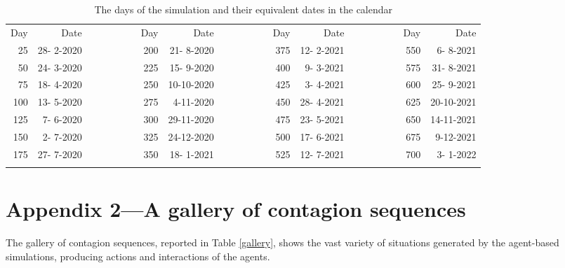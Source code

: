 \documentclass[graybox]{svmult}
\begin{document}
\begin{table}[t]
\begin{center}
\begin{footnotesize}
\begin{tabular}{rrrrrrrrrrr}
\hline\noalign{\smallskip}
 Day & Date &~~~~~~~~& Day & Date &~~~~~~~~& Day & Date &~~~~~~~~& Day & Date \\
 \noalign{\smallskip}\svhline\noalign{\smallskip}
 25 & 28- 2-2020 & & 200 & 21- 8-2020 & & 375 & 12- 2-2021 & & 550 & 6- 8-2021 \\
 50 & 24- 3-2020 & & 225 & 15- 9-2020 & & 400 & 9- 3-2021 & & 575 & 31- 8-2021 \\
 75 & 18- 4-2020 & & 250 & 10-10-2020 & & 425 & 3- 4-2021 & & 600 & 25- 9-2021 \\
100 & 13- 5-2020 & & 275 & 4-11-2020 & & 450 & 28- 4-2021 & & 625 & 20-10-2021 \\
125 & 7- 6-2020 & & 300 & 29-11-2020 & & 475 & 23- 5-2021 & & 650 & 14-11-2021 \\
150 & 2- 7-2020 & & 325 & 24-12-2020 & & 500 & 17- 6-2021 & & 675 & 9-12-2021 \\
175 & 27- 7-2020 & & 350 & 18- 1-2021 & & 525 & 12- 7-2021 & & 700 & 3- 1-2022 \\
\hline\noalign{\smallskip}
\end{tabular}
\end{footnotesize}
\caption{The days of the simulation and their equivalent dates in the calendar}
\label{dates}
\end{center}
\end{table}


\section{Appendix 2---A gallery of contagion sequences}
\label{app2}

The gallery of contagion sequences, reported in Table \ref{gallery}, shows the vast variety of situations generated by the agent-based simulations, producing actions and interactions of the agents.
\end{document}
